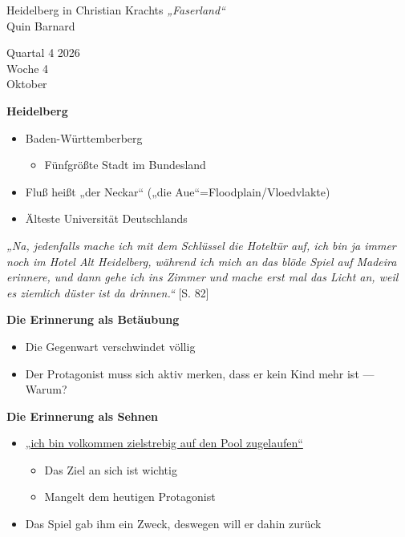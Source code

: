 \documentclass[12pt,a4paper]{article}
\begin{document}
%
\begin{center}
{\Huge Heidelberg in Christian Krachts \textit{„Faserland“}}\\
{\Large Quin Barnard}
\end{center}
%
\begin{flushright}
    Quartal 4 2026\\
    Woche 4\\
    Oktober\\
\end{flushright}
%
\textbf{\large Heidelberg}
\begin{itemize}
    \item Baden-Württemberberg
        \begin{itemize}[label=$\circ$]
            \item Fünfgrößte Stadt im Bundesland
        \end{itemize}
    \item Fluß heißt „der Neckar“ („die Aue“=Floodplain/Vloedvlakte)
    \item Älteste Universität Deutschlands
\end{itemize}
%
\begin{center}
{\large
    \textit{
        „Na, jedenfalls mache ich mit dem Schlüssel die Hoteltür auf, ich bin ja immer noch im Hotel Alt Heidelberg, während ich mich an das blöde Spiel auf Madeira erinnere, und dann gehe ich ins Zimmer und mache erst mal das Licht an, weil es ziemlich düster ist da drinnen.“
    }
}
[S. 82]
\end{center}
%
\vspace{.5em}
\textbf{\large Die Erinnerung als Betäubung}
\begin{itemize}
    \item Die Gegenwart verschwindet völlig
    \item Der Protagonist muss sich aktiv merken, dass er kein Kind mehr ist — Warum?
\end{itemize}
%
\vspace{.5em}
\textbf{\large Die Erinnerung als Sehnen}
\begin{itemize}
    \item \underline{„ich bin volkommen zielstrebig auf den Pool zugelaufen“}
        \begin{itemize}[label=$\circ$]
            \item Das Ziel an sich ist wichtig
            \item Mangelt dem heutigen Protagonist
        \end{itemize}
    \item Das Spiel gab ihm ein Zweck, deswegen will er dahin zurück
\end{itemize}
\end{document}
